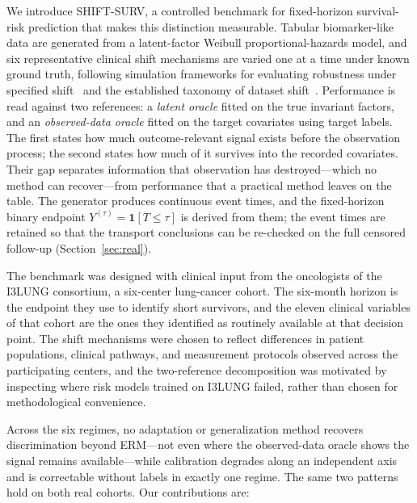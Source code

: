 We introduce SHIFT-SURV, a controlled benchmark for fixed-horizon survival-risk
prediction that makes this distinction measurable. Tabular biomarker-like data
are generated from a latent-factor Weibull proportional-hazards model, and six
representative clinical shift mechanisms are varied one at a time under known
ground truth, following simulation frameworks for evaluating robustness under
specified shift~\cite{lasko2024why,zhang2021empirical,coombes2021umpire,
sun2021recovering} and the established taxonomy of dataset
shift~\cite{morenotorres2012unifying}. Performance is read against two
references: a \emph{latent oracle} fitted on the true invariant factors, and an
\emph{observed-data oracle} fitted on the target covariates using target labels.
The first states how much outcome-relevant signal exists before the observation
process; the second states how much of it survives into the recorded covariates.
Their gap separates information that observation has destroyed---which no
method can recover---from performance that a practical method leaves on the
table. The generator produces continuous event times, and the fixed-horizon
binary endpoint $Y^{(\tau)}=\mathbf{1}[T\leq\tau]$ is derived from them; the
event times are retained so that the transport conclusions can be re-checked on
the full censored follow-up (Section~\ref{sec:real}).

The benchmark was designed with clinical input from the oncologists of the
I3LUNG consortium, a six-center lung-cancer cohort. The six-month horizon is the
endpoint they use to identify short survivors, and the eleven clinical variables
of that cohort are the ones they identified as routinely available at that
decision point. The shift mechanisms were chosen to reflect differences in
patient populations, clinical pathways, and measurement protocols observed
across the participating centers, and the two-reference decomposition was
motivated by inspecting where risk models trained on I3LUNG failed, rather than
chosen for methodological convenience.

Across the six regimes, no adaptation or generalization method recovers
discrimination beyond ERM---not even where the observed-data oracle shows the
signal remains available---while calibration degrades along an independent axis
and is correctable without labels in exactly one regime. The same two patterns
hold on both real cohorts. Our contributions are:

